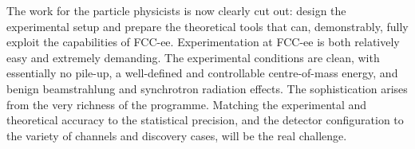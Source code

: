 The work for the particle physicists is now clearly cut out: design the experimental setup and prepare the theoretical tools that can, demonstrably, fully exploit the capabilities of FCC-ee. 
Experimentation at FCC-ee is both relatively easy and extremely demanding. 
The experimental conditions are clean, with essentially no pile-up, a well-defined and controllable centre-of-mass energy, and benign beamstrahlung and synchrotron radiation effects. 
The sophistication arises from the very richness of the programme. 
Matching the experimental and theoretical accuracy to the statistical precision, and the detector configuration to the variety of channels and discovery cases, will be the real challenge.